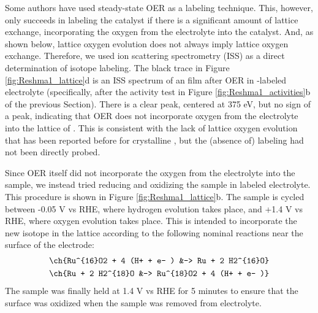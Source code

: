 Some authors have used steady-state OER as a labeling technique\cite{Stoerzinger2017, Grimaud2017}. This, however, only succeeds in labeling the catalyst if there is a significant amount of lattice exchange, incorporating the oxygen from the electrolyte into the catalyst. And, as shown below, lattice oxygen evolution does not always imply lattice oxygen exchange. Therefore, we used ion scattering spectrometry (ISS) as a direct determination of isotope labeling. The black trace in Figure \ref{fig:Reshma1_lattice}d is an ISS spectrum of an  film after OER in -labeled electrolyte (specifically, after the activity test in Figure \ref{fig:Reshma1_activities}b of the previous Section). There is a clear  peak, centered at 375 eV, but no sign of a  peak, indicating that OER does not incorporate oxygen from the electrolyte into the lattice of . This is consistent with the lack of lattice oxygen evolution that has been reported before for crystalline \cite{Stoerzinger2017}, but the (absence of) labeling had not been directly probed. 

Since OER itself did not incorporate the oxygen from the electrolyte into the sample, we instead tried reducing and oxidizing the sample in labeled electrolyte. This procedure is shown in Figure \ref{fig:Reshma1_lattice}b. The sample is cycled between -0.05 V vs RHE, where hydrogen evolution takes place, and +1.4 V vs RHE, where oxygen evolution takes place. This is intended to incorporate the new isotope in the lattice according to the following nominal reactions near the surface of the electrode:
\begin{align}
\ch{Ru^{16}O2 + 4 (H+ + e- ) &-> Ru + 2 H2^{16}O}\nonumber\\
\ch{Ru + 2 H2^{18}O &-> Ru^{18}O2 + 4 (H+ + e- )}\label{rxn:Ru_labeling}
\end{align}
The sample was finally held at 1.4 V vs RHE for 5 minutes to ensure that the surface was oxidized when the sample was removed from electrolyte. 

